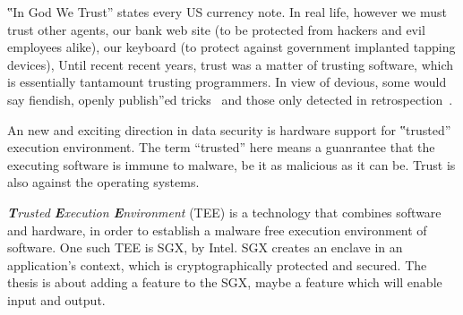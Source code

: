 ‟In God We Trust” states every US currency note. In real life, however we must
trust other agents, our bank web site (to be protected from hackers and evil
employees alike), our keyboard (to protect against government implanted
tapping devices), Until recent recent years, trust was a matter of
trusting software, which is essentially tantamount trusting programmers. In
view of devious, some would say fiendish,
openly publish''ed tricks~\cite{Thompson:something} and those only detected in
retrospection~\cite{this:and:that}.

An new and exciting direction in data security is hardware support for
‟trusted” execution environment. The term ``trusted'' here means a guanrantee
that the executing software is immune to malware, be it as malicious as it can be.
Trust is also against the operating systems. 

\emph{\textbf Trusted \textbf Execution \textbf Environment} (TEE) is a technology that combines
software and hardware, in order to establish a malware free execution environment of software.
One such TEE is SGX, by Intel. SGX creates an enclave in an application’s context, which is cryptographically protected and secured.
The thesis is about adding a feature to the SGX, maybe a feature which will enable input and output.

\lipsum*[1]\cite{Tegarden:Sheetz:Monarchi:92}

\lipsum*[1]\cite{Lamport:latex:94}
